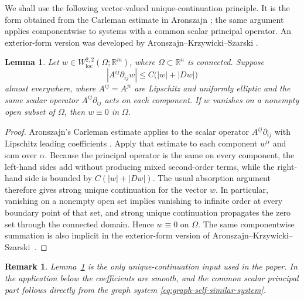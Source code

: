 \documentclass[11pt,a4paper]{article}
\numberwithin{equation}{section}
\newtheorem{lemma}[theorem]{Lemma}
\newtheorem{remark}[theorem]{Remark}
\newcommand{\R}{\mathbb R}
\begin{document}
We shall use the following vector-valued unique-continuation principle.  It is the form obtained from the Carleman estimate in Aronszajn \cite{Aronszajn1957}; the same argument applies componentwise to systems with a common scalar principal operator. An exterior-form version was developed by Aronszajn--Krzywicki--Szarski \cite{Aronszajn1962}.

\begin{lemma}\label{lem:ucp-external}
Let $w\in W^{2,2}_{\mathrm{loc}}(\Omega;\R^m)$, where $\Omega\subset\R^n$ is connected.  Suppose
\begin{equation}\label{eq:ucp-inequality}
        |A^{ij}\partial_{ij}w|
        \le C\bigl(|w|+|Dw|\bigr)
\end{equation}
almost everywhere, where $A^{ij}=A^{ji}$ are Lipschitz and uniformly elliptic and the same scalar operator $A^{ij}\partial_{ij}$ acts on each component.  If $w$ vanishes on a nonempty open subset of $\Omega$, then $w\equiv0$ in $\Omega$.
\end{lemma}

\begin{proof}
Aronszajn's Carleman estimate applies to the scalar operator
$A^{ij}\partial_{ij}$ with Lipschitz leading coefficients
\cite{Aronszajn1957}.  Apply that estimate to each component $w^\alpha$ and
sum over $\alpha$.  Because the principal operator is the same on every
component, the left-hand sides add without producing mixed second-order
terms, while the right-hand side is bounded by
$C(|w|+|Dw|)$.  The usual absorption argument therefore gives strong unique
continuation for the vector $w$.  In particular, vanishing on a nonempty open
set implies vanishing to infinite order at every boundary point of that set,
and strong unique continuation propagates the zero set through the connected
domain.  Hence $w\equiv0$ on $\Omega$.  The same componentwise summation is
also implicit in the exterior-form version of
Aronszajn--Krzywicki--Szarski~\cite{Aronszajn1962}.
\end{proof}
\begin{remark}
Lemma~\ref{lem:ucp-external} is the only unique-continuation input used in the paper.  In the application below the coefficients are smooth, and the common scalar principal part follows directly from the graph system \eqref{eq:graph-self-similar-system}.
\end{remark}
\end{document}

